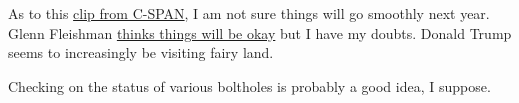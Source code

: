 As to this
\href{https://www.c-span.org/video/?c5090137/user-clip-donald-trump-worry-voting}{clip
from C-SPAN}, I am not sure things will go smoothly next year. Glenn
Fleishman
\href{https://web.archive.org/web/20231025194432/https://twit.social/@glennf/111297160699427985}{thinks
things will be okay} but I have my doubts. Donald Trump seems to
increasingly be visiting fairy land.

Checking on the status of various boltholes is probably a good idea, I
suppose.
